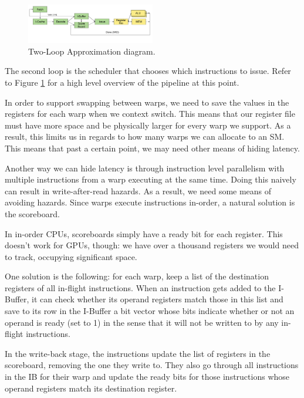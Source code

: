 \begin{figure}[h]
    \centering
    \includegraphics[width=0.5\textwidth]{assets/2.png}
    \caption{Two-Loop Approximation diagram. }
    \label{fig:twoloop}
\end{figure}

The second loop is the scheduler that chooses which instructions to issue.
Refer to Figure \ref{fig:twoloop} for a high level overview of the pipeline at this point.

In order to support swapping between warps, we need to save the values in
the registers for each warp when we context switch.
This means that our register file must have more space and be physically larger
for every warp we support.
As a result, this limits us in regards to how many warps we can allocate to an
SM. This means that past a certain point, we may need other means of hiding
latency.

Another way we can hide latency is through instruction level parallelism with multiple instructions from a warp executing at the same time.
Doing this naively can result in write-after-read hazards. As a result, we need 
some means of avoiding hazards. Since warps execute instructions in-order,
a natural solution is the scoreboard.

In in-order CPUs, scoreboards simply have a ready bit for each register.
This doesn't work for GPUs, though: we have over a thousand registers we
would need to track, occupying significant space.

One solution is the following: for each warp, keep a list of the destination
registers of all in-flight instructions. When an instruction gets added to
the I-Buffer, it can check whether its operand registers match those
in this list and save to its row in the I-Buffer a bit vector whose
bits indicate whether or not an operand is ready (set to 1) in the sense that
it will not be written to by any in-flight instructions.

In the write-back stage, the instructions update the list of registers in the scoreboard,
removing the one they write to.
They also go through all instructions in the IB for their warp and update the
ready bits for those instructions whose operand registers match its destination register.

